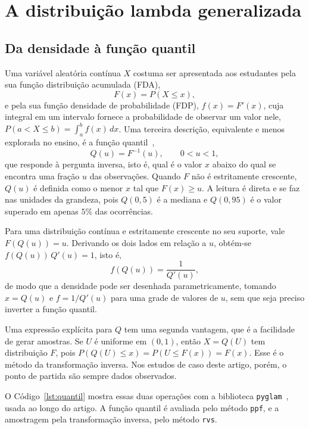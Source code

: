 \section{A distribuição lambda generalizada}\label{sec:gld}

\subsection{Da densidade à função quantil}

Uma variável aleatória contínua $X$ costuma ser apresentada aos estudantes pela sua função distribuição acumulada (FDA),
\begin{equation}
    F(x) = P(X \leq x),
\end{equation}
e pela sua função densidade de probabilidade (FDP), $f(x) = F'(x)$, cuja integral em um intervalo fornece a probabilidade de observar um valor nele, $P(a < X \leq b) = \int_a^b f(x)\,dx$. Uma terceira descrição, equivalente e menos explorada no ensino, é a função quantil~\cite{gilchrist2000},
\begin{equation}
    Q(u) = F^{-1}(u), \qquad 0 < u < 1,
    \label{eq:quantil}
\end{equation}
que responde à pergunta inversa, isto é, qual é o valor $x$ abaixo do qual se encontra uma fração $u$ das observações. Quando $F$ não é estritamente crescente, $Q(u)$ é definida como o menor $x$ tal que $F(x) \geq u$. A leitura é direta e se faz nas unidades da grandeza, pois $Q(0{,}5)$ é a mediana e $Q(0{,}95)$ é o valor superado em apenas $5\%$ das ocorrências.

Para uma distribuição contínua e estritamente crescente no seu suporte, vale $F(Q(u)) = u$. Derivando os dois lados em relação a $u$, obtém-se $f(Q(u))\,Q'(u) = 1$, isto é,
\begin{equation}
    f(Q(u)) = \frac{1}{Q'(u)},
    \label{eq:densidade_quantil}
\end{equation}
de modo que a densidade pode ser desenhada parametricamente, tomando $x = Q(u)$ e $f = 1/Q'(u)$ para uma grade de valores de $u$, sem que seja preciso inverter a função quantil.

Uma expressão explícita para $Q$ tem uma segunda vantagem, que é a facilidade de gerar amostras. Se $U$ é uniforme em $(0,1)$, então $X = Q(U)$ tem distribuição $F$, pois $P(Q(U) \leq x) = P(U \leq F(x)) = F(x)$. Esse é o método da transformação inversa. Nos estudos de caso deste artigo, porém, o ponto de partida são sempre dados observados.

O Código~\ref{lst:quantil} mostra essas duas operações com a biblioteca \texttt{pyglam}~\cite{pyglam}, usada ao longo do artigo. A função quantil é avaliada pelo método \texttt{ppf}, e a amostragem pela transformação inversa, pelo método \texttt{rvs}.

